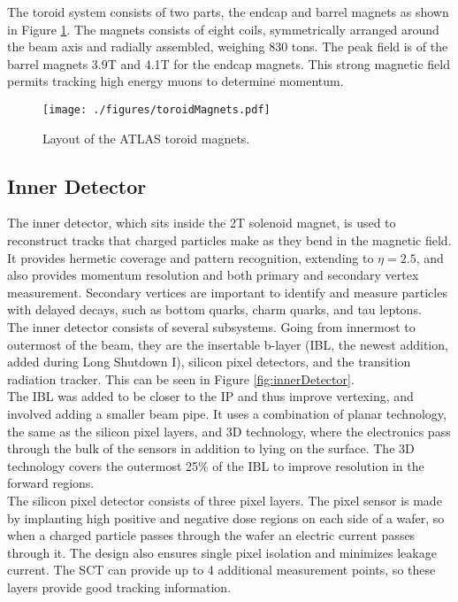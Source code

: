 The toroid system consists of two parts, the endcap and barrel magnets as shown in Figure \ref{fig:atlasToroids}.  The magnets consists of eight coils, symmetrically arranged around the beam axis and radially assembled, weighing 830 tons.  The peak field is of the barrel magnets 3.9T and 4.1T for the endcap magnets.  This strong magnetic field permits tracking high energy muons to determine momentum.\\

\begin{figure}[h!]
  \centering
	\texttt{[image: ./figures/toroidMagnets.pdf]}
\caption{\label{fig:atlasToroids}{ Layout of the ATLAS toroid magnets. }} %
\end{figure}

\subsection{Inner Detector}

The inner detector, which sits inside the 2T solenoid magnet, is used to reconstruct tracks that charged particles make as they bend in the magnetic field.  It provides hermetic coverage and pattern recognition, extending to $\eta=2.5$, and also provides momentum resolution and both primary and secondary vertex measurement.  Secondary vertices are important to identify and measure particles with delayed decays, such as bottom quarks, charm quarks, and tau leptons.  \\

The inner detector consists of several subsystems.  Going from innermost to outermost of the beam, they are the insertable b-layer (IBL, the newest addition, added during Long Shutdown I), silicon pixel detectors, and the transition radiation tracker.  This can be seen in Figure \ref{fig:innerDetector}.\\

The IBL was added to be closer to the IP and thus improve vertexing, and involved adding a smaller beam pipe.  It uses a combination of planar technology, the same as the silicon pixel layers, and 3D technology, where the electronics pass through the bulk of the sensors in addition to lying on the surface.  The 3D technology covers the outermost 25\% of the IBL to improve resolution in the forward regions. \\ %

The silicon pixel detector consists of three pixel layers.  The pixel sensor is made by implanting high positive and negative dose regions on each side of a wafer, so when a charged particle passes through the wafer an electric current passes through it.  The design also ensures single pixel isolation and minimizes leakage current.  The SCT can provide up to 4 additional measurement points, so these layers provide good tracking information.  \\%

